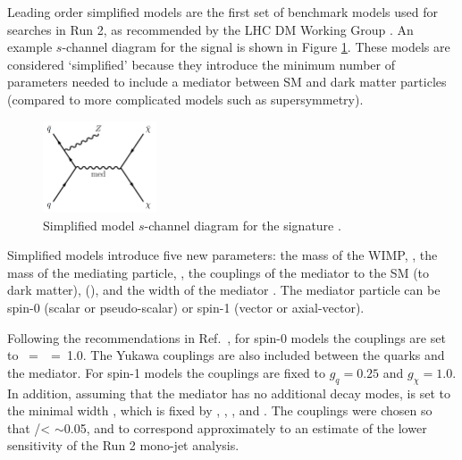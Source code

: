 Leading order simplified models are the first set of benchmark models used for \etmissX searches in Run 2, as recommended by the LHC DM Working Group \cite{Boveia:2016mrp}. An example $s$-channel diagram for the \Zetmiss signal is shown in Figure \ref{fig:simp}. These models are considered `simplified' because they introduce the minimum number of parameters needed to include a mediator between SM and dark matter particles (compared to more complicated models such as supersymmetry). 

\begin{figure}[htb]
\centering
{}
\includegraphics[width=0.3\textwidth]{Figures/simp.png}
\caption{Simplified model $s$-channel diagram for the \monoZ signature \cite{Aaboud:2017bja}.}
\label{fig:simp}
\end{figure}

Simplified models introduce five new parameters: the mass of the WIMP, \mchi, the mass of the mediating particle, \mmed, the couplings of the mediator to the SM (to dark matter), \gq (\gchi), and the width of the mediator \Wmed. The mediator particle can be spin-0 (scalar or pseudo-scalar) or spin-1 (vector or axial-vector). 




Following the recommendations in Ref.\ \cite{Boveia:2016mrp}, for spin-0 models the couplings are set to \gq~=~\gchi~=~1.0. The Yukawa couplings are also included between the quarks and the mediator. For spin-1 models the couplings are fixed to $g_q = 0.25$ and $g_\chi = 1.0$. In addition, assuming that the mediator has no additional decay modes, \Wmed is set to the minimal width \cite{Abercrombie:2015wmb}, which is fixed by \gq, \gchi, \mchi, and \mmed. The couplings were chosen so that \Wmed/\mmed < $\sim$0.05, and to correspond approximately to an estimate of the lower sensitivity of the Run 2 mono-jet analysis.


